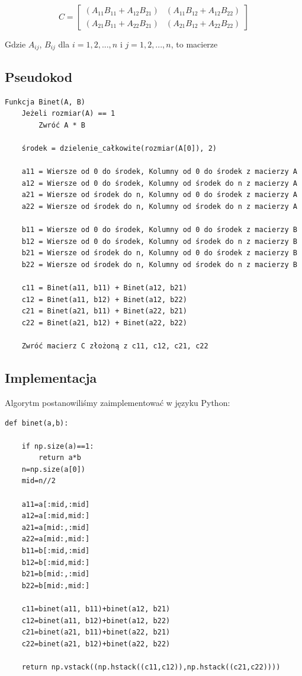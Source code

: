 \documentclass{article}
\begin{document}
\[
C =
\begin{bmatrix}
(A_{11}B_{11} + A_{12}B_{21}) & (A_{11}B_{12} + A_{12}B_{22}) \\
(A_{21}B_{11} + A_{22}B_{21}) & (A_{21}B_{12} + A_{22}B_{22})
\end{bmatrix}
\]

\bigbreak
\noindent
Gdzie \(A_{ij}\), \(B_{ij}\) dla \(i = {1, 2, ..., n}\) i \({j = {1, 2, ..., n}}\), to macierze


\subsection{Pseudokod}

\begin{verbatim}
Funkcja Binet(A, B)
    Jeżeli rozmiar(A) == 1
        Zwróć A * B

    środek = dzielenie_całkowite(rozmiar(A[0]), 2) 
    
    a11 = Wiersze od 0 do środek, Kolumny od 0 do środek z macierzy A
    a12 = Wiersze od 0 do środek, Kolumny od środek do n z macierzy A
    a21 = Wiersze od środek do n, Kolumny od 0 do środek z macierzy A
    a22 = Wiersze od środek do n, Kolumny od środek do n z macierzy A
    
    b11 = Wiersze od 0 do środek, Kolumny od 0 do środek z macierzy B
    b12 = Wiersze od 0 do środek, Kolumny od środek do n z macierzy B
    b21 = Wiersze od środek do n, Kolumny od 0 do środek z macierzy B
    b22 = Wiersze od środek do n, Kolumny od środek do n z macierzy B

    c11 = Binet(a11, b11) + Binet(a12, b21)
    c12 = Binet(a11, b12) + Binet(a12, b22)
    c21 = Binet(a21, b11) + Binet(a22, b21)
    c22 = Binet(a21, b12) + Binet(a22, b22)

    Zwróć macierz C złożoną z c11, c12, c21, c22
\end{verbatim}

\subsection{Implementacja}

Algorytm postanowiliśmy zaimplementować w języku Python:

\begin{verbatim}
def binet(a,b):
    
    if np.size(a)==1:
        return a*b
    n=np.size(a[0])
    mid=n//2
    
    a11=a[:mid,:mid]
    a12=a[:mid,mid:]
    a21=a[mid:,:mid]
    a22=a[mid:,mid:]
    b11=b[:mid,:mid]
    b12=b[:mid,mid:]
    b21=b[mid:,:mid]
    b22=b[mid:,mid:]

    c11=binet(a11, b11)+binet(a12, b21)
    c12=binet(a11, b12)+binet(a12, b22)
    c21=binet(a21, b11)+binet(a22, b21)
    c22=binet(a21, b12)+binet(a22, b22)

    return np.vstack((np.hstack((c11,c12)),np.hstack((c21,c22))))
\end{verbatim}
\end{document}
